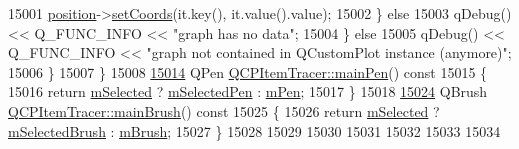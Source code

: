 \begin{DoxyCode}
15001         \hyperlink{a00042_a69917e2fdb2b3a929c196958feee7cbe}{position}->\hyperlink{a00038_aa988ba4e87ab684c9021017dcaba945f}{setCoords}(it.key(), it.value().value);
15002       \} \textcolor{keywordflow}{else}
15003         qDebug() << Q\_FUNC\_INFO << \textcolor{stringliteral}{"graph has no data"};
15004     \} \textcolor{keywordflow}{else}
15005       qDebug() << Q\_FUNC\_INFO << \textcolor{stringliteral}{"graph not contained in QCustomPlot instance (anymore)"};
15006   \}
15007 \}
15008 
\hypertarget{a00115_source_l15014}{}\hyperlink{a00042_af87132b7698d5bb35c96a8a0b9e7180e}{15014} QPen \hyperlink{a00042_af87132b7698d5bb35c96a8a0b9e7180e}{QCPItemTracer::mainPen}()\textcolor{keyword}{ const}
15015 \textcolor{keyword}{}\{
15016   \textcolor{keywordflow}{return} \hyperlink{a00022_a4bdb3457dad1d268c0f78a44152b9645}{mSelected} ? \hyperlink{a00042_a3f61829784200819661d1e2a5354d866}{mSelectedPen} : \hyperlink{a00042_a579e3bd6bd16d6aaff03638dc8a99a69}{mPen};
15017 \}
15018 
\hypertarget{a00115_source_l15024}{}\hyperlink{a00042_aaf4e72e2d87f53279b9f9ba624961bf5}{15024} QBrush \hyperlink{a00042_aaf4e72e2d87f53279b9f9ba624961bf5}{QCPItemTracer::mainBrush}()\textcolor{keyword}{ const}
15025 \textcolor{keyword}{}\{
15026   \textcolor{keywordflow}{return} \hyperlink{a00022_a4bdb3457dad1d268c0f78a44152b9645}{mSelected} ? \hyperlink{a00042_a1c15d2adde40efdcc0ef1ff78fd256a6}{mSelectedBrush} : \hyperlink{a00042_a6597be63a17a266233941354200b2340}{mBrush};
15027 \}
15028 
15029 
15030 
15031 
15032 
15033 
15034 
\end{DoxyCode}
